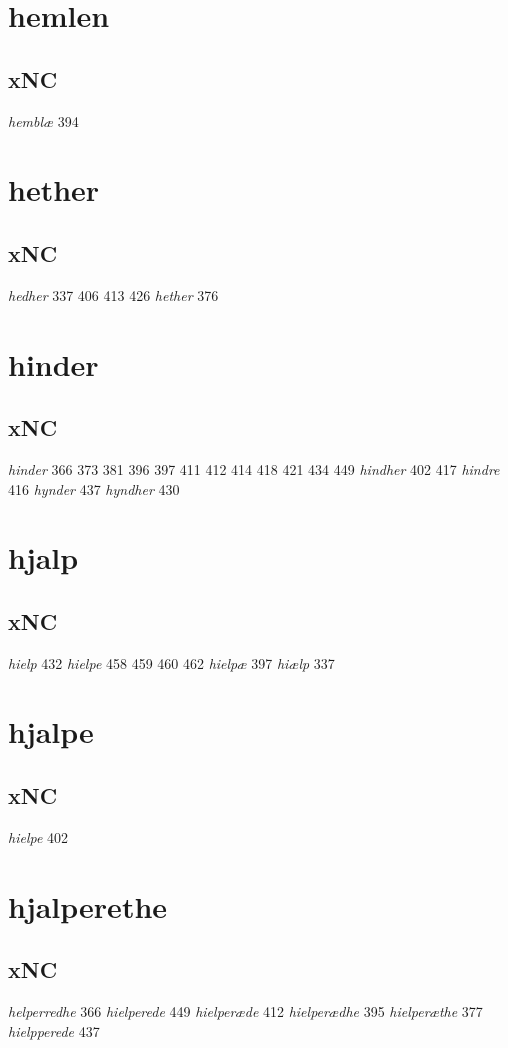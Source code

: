 \documentclass[a4paper,twocolumn]{article}
\begin{document}
\section{hemlen}
\label{sec:orgac01a5c}
\subsection{xNC}
\label{sec:org6f9818c}
\emph{hemblæ} 394 
\section{hether}
\label{sec:orgaf91a2a}
\subsection{xNC}
\label{sec:org1e79cf0}
\emph{hedher} 337 406 413 426 \emph{hether} 376 
\section{hinder}
\label{sec:orge719b27}
\subsection{xNC}
\label{sec:org314273a}
\emph{hinder} 366 373 381 396 397 411 412 414 418 421 434 449 \emph{hindher} 402 417 \emph{hindre} 416 \emph{hynder} 437 \emph{hyndher} 430 
\section{hjalp}
\label{sec:orgbfbd049}
\subsection{xNC}
\label{sec:orge7fb241}
\emph{hielp} 432 \emph{hielpe} 458 459 460 462 \emph{hielpæ} 397 \emph{hiælp} 337 
\section{hjalpe}
\label{sec:org0d84420}
\subsection{xNC}
\label{sec:orgfc90df1}
\emph{hielpe} 402 
\section{hjalperethe}
\label{sec:orgcba1ca9}
\subsection{xNC}
\label{sec:org2f0e9ee}
\emph{helperredhe} 366 \emph{hielperede} 449 \emph{hielperæde} 412 \emph{hielperædhe} 395 \emph{hielperæthe} 377 \emph{hielpperede} 437 
\end{document}
